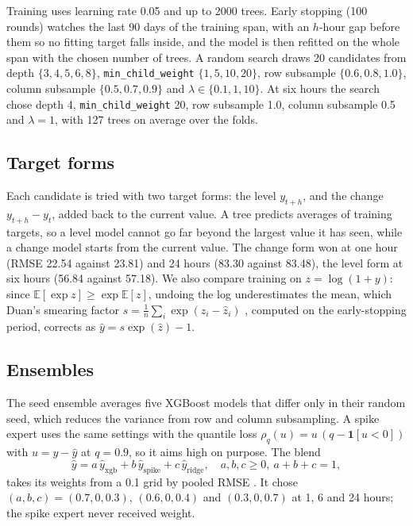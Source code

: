 \documentclass[conference]{IEEEtran}
\newcommand{\col}[1]{\texttt{#1}}
\begin{document}
Training uses learning rate 0.05 and up to \num{2000} trees. Early stopping (100 rounds) watches the last 90 days of the training span, with an $h$-hour gap before them so no fitting target falls inside, and the model is then refitted on the whole span with the chosen number of trees. A random search draws 20 candidates from depth $\{3,4,5,6,8\}$, \col{min\_child\_weight} $\{1,5,10,20\}$, row subsample $\{0.6,0.8,1.0\}$, column subsample $\{0.5,0.7,0.9\}$ and $\lambda \in \{0.1,1,10\}$. At six hours the search chose depth 4, \col{min\_child\_weight} 20, row subsample 1.0, column subsample 0.5 and $\lambda = 1$, with 127 trees on average over the folds.

\subsection{Target forms}
Each candidate is tried with two target forms: the level $y_{t+h}$, and the change $y_{t+h} - y_t$, added back to the current value. A tree predicts averages of training targets, so a level model cannot go far beyond the largest value it has seen, while a change model starts from the current value. The change form won at one hour (RMSE 22.54 against 23.81) and 24 hours (83.30 against 83.48), the level form at six hours (56.84 against 57.18). We also compare training on $z = \log(1+y)$: since $\mathbb{E}[\exp z] \ge \exp \mathbb{E}[z]$, undoing the log underestimates the mean, which Duan's smearing factor $s = \frac{1}{n}\sum_i \exp(z_i - \hat{z}_i)$ \cite{duan1983}, computed on the early-stopping period, corrects as $\hat{y} = s\exp(\hat{z}) - 1$.

\subsection{Ensembles}
The seed ensemble averages five XGBoost models that differ only in their random seed, which reduces the variance from row and column subsampling. A spike expert uses the same settings with the quantile loss $\rho_q(u) = u\,(q - \mathbf{1}[u < 0])$ with $u = y - \hat{y}$ at $q = 0.9$, so it aims high on purpose. The blend
\begin{equation}
\hat{y} = a\,\hat{y}_{\text{xgb}} + b\,\hat{y}_{\text{spike}} + c\,\hat{y}_{\text{ridge}}, \quad a, b, c \ge 0,\ a+b+c = 1,
\end{equation}
takes its weights from a 0.1 grid by pooled RMSE \cite{bates1969}. It chose $(a, b, c) = (0.7, 0, 0.3)$, $(0.6, 0, 0.4)$ and $(0.3, 0, 0.7)$ at 1, 6 and 24 hours; the spike expert never received weight.
\end{document}
